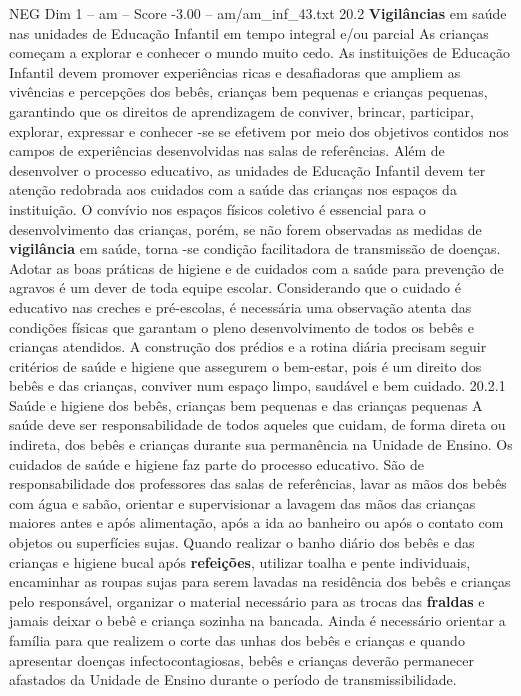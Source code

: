 \begin{textsample}{NEG Dim 1 – am – Score -3.00 – am/am\_inf\_43.txt}  \label{ex:f1_neg_061}
20.2 \textbf{Vigilâncias} em saúde nas unidades de Educação Infantil em tempo integral e/ou parcial As crianças começam a explorar e conhecer o mundo muito cedo.
As instituições de Educação Infantil devem promover experiências ricas e desafiadoras que ampliem as vivências e percepções dos bebês, crianças bem pequenas e crianças pequenas, garantindo que os direitos de aprendizagem de conviver, brincar, participar, explorar, expressar e conhecer -se se efetivem por meio dos objetivos contidos nos campos de experiências desenvolvidas nas salas de referências.
Além de desenvolver o processo educativo, as unidades de Educação Infantil devem ter atenção redobrada aos cuidados com a saúde das crianças nos espaços da instituição.
O convívio nos espaços físicos coletivo é essencial para o desenvolvimento das crianças, porém, se não forem observadas as medidas de \textbf{vigilância} em saúde, torna -se condição facilitadora de transmissão de doenças.
Adotar as boas práticas de higiene e de cuidados com a saúde para prevenção de agravos é um dever de toda equipe escolar.
Considerando que o cuidado é educativo nas creches e pré-escolas, é necessária uma observação atenta das condições físicas que garantam o pleno desenvolvimento de todos os bebês e crianças atendidos.
A construção dos prédios e a rotina diária precisam seguir critérios de saúde e higiene que assegurem o bem-estar, pois é um direito dos bebês e das crianças, conviver num espaço limpo, saudável e bem cuidado. 20.2.1 Saúde e higiene dos bebês, crianças bem pequenas e das crianças pequenas A saúde deve ser responsabilidade de todos aqueles que cuidam, de forma direta ou indireta, dos bebês e crianças durante sua permanência na Unidade de Ensino.
Os cuidados de saúde e higiene faz parte do processo educativo.
São de responsabilidade dos professores das salas de referências, lavar as mãos dos bebês com água e sabão, orientar e supervisionar a lavagem das mãos das crianças maiores antes e após alimentação, após a ida ao banheiro ou após o contato com objetos ou superfícies sujas.
Quando realizar o banho diário dos bebês e das crianças e higiene bucal após \textbf{refeições}, utilizar toalha e pente individuais, encaminhar as roupas sujas para serem lavadas na residência dos bebês e crianças pelo responsável, organizar o material necessário para as trocas das \textbf{fraldas} e jamais deixar o bebê e criança sozinha na bancada.
Ainda é necessário orientar a família para que realizem o corte das unhas dos bebês e crianças e quando apresentar doenças infectocontagiosas, bebês e crianças deverão permanecer afastados da Unidade de Ensino durante o período de transmissibilidade.

\end{textsample}
